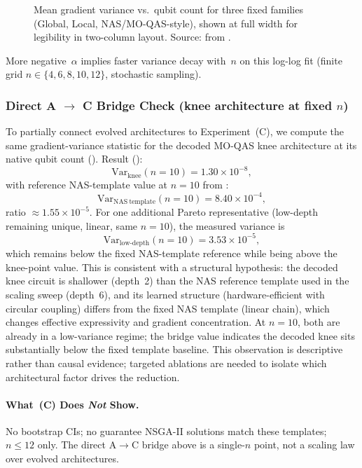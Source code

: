 \begin{figure}[t]
  \centering
  \caption{Mean gradient variance vs.\ qubit count for three fixed families
    (\textsf{Global}, \textsf{Local}, \textsf{NAS}/MO-QAS-style), shown at
    full width for legibility in two-column layout. Source:
     from .}
  \label{fig:gradient_scaling}
\end{figure}

\noindent
More negative~$\alpha$ implies faster variance decay with~$n$ on this
log-log fit (finite grid $n\in\{4,6,8,10,12\}$, stochastic sampling).

\subsubsection{Direct A $\rightarrow$ C Bridge Check (knee architecture at fixed $n$)}

To partially connect evolved architectures to Experiment~(C), we compute the
same gradient-variance statistic for the decoded MO-QAS knee architecture at its
native qubit count ().
Result ():
\[
\mathrm{Var}_{\mathrm{knee}}(n{=}10)=1.30\times 10^{-8},
\]
with reference NAS-template value at $n=10$ from
:
\[
\mathrm{Var}_{\mathrm{NAS\ template}}(n{=}10)=8.40\times 10^{-4},
\]
ratio $\approx 1.55\times 10^{-5}$.
For one additional Pareto representative (low-depth remaining unique, linear,
same $n=10$), the measured variance is
\[
\mathrm{Var}_{\mathrm{low\mbox{-}depth}}(n{=}10)=3.53\times 10^{-5},
\]
which remains below the fixed NAS-template reference while being above the
knee-point value.
This is consistent with a structural hypothesis: the decoded knee circuit is
shallower (depth~2) than the NAS reference template used in the scaling sweep
(depth~6), and its learned structure (hardware-efficient with circular coupling)
differs from the fixed NAS template (linear chain), which changes effective
expressivity and gradient concentration. At $n=10$, both are already in a
low-variance regime; the bridge value indicates the decoded knee sits substantially
below the fixed template baseline. This observation is descriptive rather than
causal evidence; targeted ablations are needed to isolate which architectural
factor drives the reduction.

\paragraph{What~(C) Does \emph{Not} Show.}
No bootstrap CIs; no guarantee NSGA-II solutions match these templates;
$n\le 12$ only. The direct A$\rightarrow$C bridge above is a single-$n$ point,
not a scaling law over evolved architectures.

